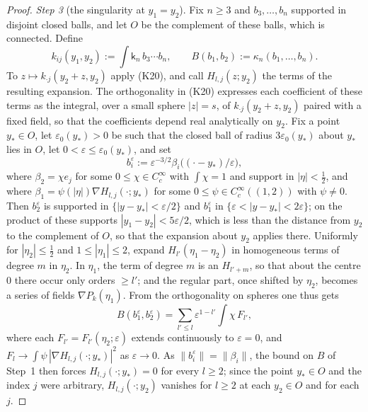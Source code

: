 \documentclass[11pt,letterpaper,reqno]{amsart}
\theoremstyle{definition}
\begin{document}
\begin{proof}
\emph{Step 3} (the singularity at $y_1=y_2$).
Fix $n\ge3$ and $b_3,\dots,b_n$ supported in disjoint closed balls, and let $O$ be the complement of these balls, which is connected.
Define
\begin{equation*}
k_{ij}(y_1,y_2):=\int\mathsf k_n\,b_3\cdots b_n,\qquad B(b_1,b_2):=\kappa_n(b_1,\dots,b_n).
\end{equation*}
To $z\mapsto k_{\cdot j}(y_2+z,y_2)$ apply (K20), and call $H_{l,j}(z;y_2)$ the terms of the resulting expansion.
The orthogonality in (K20) expresses each coefficient of these terms as the integral, over a small sphere $|z|=s$, of $k_{\cdot j}(y_2+z,y_2)$ paired with a fixed field, so that the coefficients depend real analytically on $y_2$.
Fix a point $y_*\in O$, let $\varepsilon_0(y_*)>0$ be such that the closed ball of radius $3\varepsilon_0(y_*)$ about $y_*$ lies in $O$, let $0<\varepsilon\le\varepsilon_0(y_*)$, and set
\begin{equation*}
b_i^\varepsilon:=\varepsilon^{-3/2}\beta_i\bigl((\cdot-y_*)/\varepsilon\bigr),
\end{equation*}
where $\beta_2=\chi e_j$ for some $0\le\chi\in C_c^\infty$ with $\int\chi=1$ and support in $|\eta|<\frac12$, and where $\beta_1=\psi(|\eta|)\nabla H_{l,j}(\cdot;y_*)$ for some $0\le\psi\in C_c^\infty((1,2))$ with $\psi\ne0$.
Then $b_2^\varepsilon$ is supported in $\{|y-y_*|<\varepsilon/2\}$ and $b_1^\varepsilon$ in $\{\varepsilon<|y-y_*|<2\varepsilon\}$;
on the product of these supports $|y_1-y_2|<5\varepsilon/2$, which is less than the distance from $y_2$ to the complement of $O$, so that the expansion about $y_2$ applies there.
Uniformly for $|\eta_2|\le\frac12$ and $1\le|\eta_1|\le2$, expand $H_{l'}(\eta_1-\eta_2)$ in homogeneous terms of degree $m$ in $\eta_2$.
In $\eta_1$, the term of degree $m$ is an $H_{l'+m}$, so that about the centre $0$ there occur only orders $\ge l'$; and the regular part, once shifted by $\eta_2$, becomes a series of fields $\nabla P_k(\eta_1)$.
From the orthogonality on spheres one thus gets
\begin{equation*}
B(b_1^\varepsilon,b_2^\varepsilon)=\sum_{l'\le l}\varepsilon^{1-l'}\int\chi\,F_{l'},
\end{equation*}
where each $F_{l'}=F_{l'}(\eta_2;\varepsilon)$ extends continuously to $\varepsilon=0$, and $F_l\to\int\psi\,|\nabla H_{l,j}(\cdot;y_*)|^2$ as $\varepsilon\to0$.
As $\|b_i^\varepsilon\|=\|\beta_i\|$, the bound on $B$ of Step~1 then forces $H_{l,j}(\cdot;y_*)=0$ for every $l\ge2$;
since the point $y_*\in O$ and the index $j$ were arbitrary, $H_{l,j}(\cdot;y_2)$ vanishes for $l\ge2$ at each $y_2\in O$ and for each $j$.


\end{proof}
\end{document}
